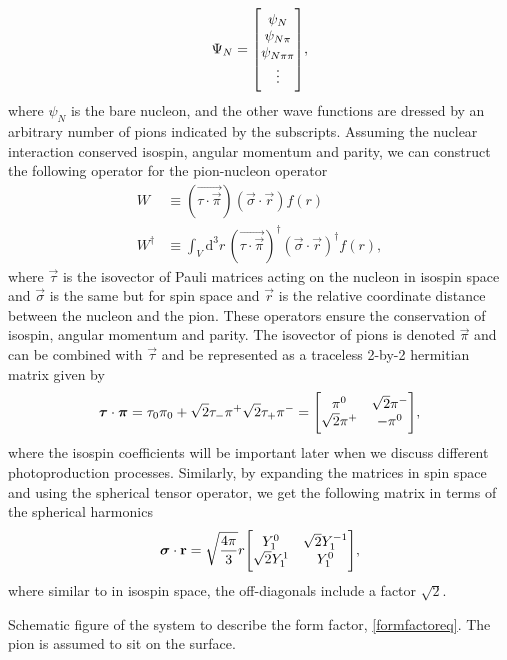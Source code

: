 \begin{equation} \label{superposition}
	\Psi_N = \mqty[\psi_{N} \\
	\psi_{N\pi} \\
	\psi_{N\pi\pi}\\
	\vdots],
\end{equation}
where $\psi_{N}$ is the bare nucleon, and the other wave functions are dressed by an arbitrary number of pions indicated by the subscripts. Assuming the nuclear interaction conserved isospin, angular momentum and parity, we can construct the following operator for the pion-nucleon operator
\begin{align} \label{W}
	W & \equiv (\vec{\tau\cdot\vec{\pi}})(\vec{\sigma}\cdot\vec{r})f(r) \\
	W^\dagger & \equiv  \int_V \text{d}^3 r \, (\vec{\tau\cdot\vec{\pi}})^\dagger (\vec{\sigma}\cdot\vec{r})^\dagger f(r) \label{Wdagger},
\end{align}
where $\vec{\tau}$ is the isovector of Pauli matrices acting on the nucleon in isospin space and $\vec{\sigma}$ is the same but for spin space and $\vec{r}$ is the relative coordinate distance between the nucleon and the pion. These operators ensure the conservation of isospin, angular momentum and parity. The isovector of pions is denoted $\vec{\pi}$ and can be combined with $\vec{\tau}$ and be represented as a traceless 2-by-2 hermitian matrix given by
\begin{equation} \label{isocoeff}
	\vec{\tau}\cdot \vec{\pi} = \tau_0  \pi_0+ \sqrt{2} \tau_{-}\pi^ +\sqrt{2}\tau_{+} \pi^{-} = \mqty[\pi^0 & \sqrt{2}\pi^- \\
	\sqrt{2}\pi^+ & -\pi^0],
\end{equation}
where the isospin coefficients will be important later when we discuss different photoproduction processes. Similarly, by expanding the matrices in spin space and using the spherical tensor operator, we get the following matrix in terms of the spherical harmonics
\begin{equation}\label{spinmatrix}
	\vec{\sigma}\cdot \vec{r} = \sqrt{\frac{4\pi}{3}} r \mqty[Y_{1}^0 & \sqrt{2}Y_1^{-1} \\ \sqrt{2}Y_1^1 & Y_1^0],
\end{equation}
where similar to in isospin space, the off-diagonals include a factor $\sqrt{2}$.  
\begin{marginfigure}
	\centering
	
	\caption{Schematic figure of the system to describe the form factor, \eqref{formfactoreq}. The pion is assumed to sit on the surface.}
	\label{formfactor}
\end{marginfigure}
